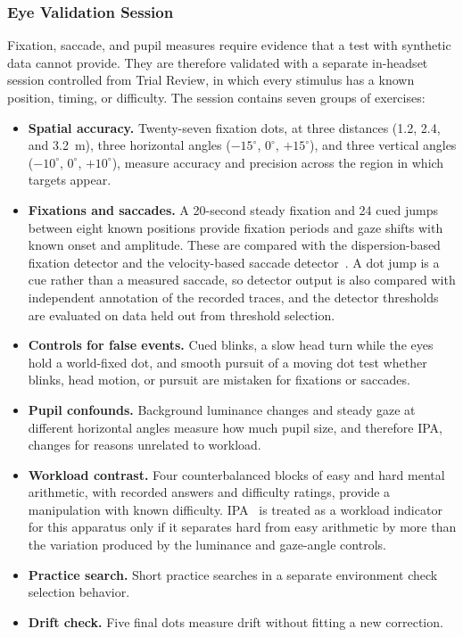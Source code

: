 \subsubsection{Eye Validation Session}
Fixation, saccade, and pupil measures require evidence that a test with synthetic data cannot provide. They are therefore validated with a separate in-headset session controlled from Trial Review, in which every stimulus has a known position, timing, or difficulty. The session contains seven groups of exercises:
\begin{itemize}
\item \textbf{Spatial accuracy.} Twenty-seven fixation dots, at three distances (1.2, 2.4, and 3.2~m), three horizontal angles ($-15^\circ$, $0^\circ$, $+15^\circ$), and three vertical angles ($-10^\circ$, $0^\circ$, $+10^\circ$), measure accuracy and precision across the region in which targets appear.
\item \textbf{Fixations and saccades.} A 20-second steady fixation and 24 cued jumps between eight known positions provide fixation periods and gaze shifts with known onset and amplitude. These are compared with the dispersion-based fixation detector and the velocity-based saccade detector~\cite{salvucci2000fixations}. A dot jump is a cue rather than a measured saccade, so detector output is also compared with independent annotation of the recorded traces, and the detector thresholds are evaluated on data held out from threshold selection.
\item \textbf{Controls for false events.} Cued blinks, a slow head turn while the eyes hold a world-fixed dot, and smooth pursuit of a moving dot test whether blinks, head motion, or pursuit are mistaken for fixations or saccades.
\item \textbf{Pupil confounds.} Background luminance changes and steady gaze at different horizontal angles measure how much pupil size, and therefore IPA, changes for reasons unrelated to workload.
\item \textbf{Workload contrast.} Four counterbalanced blocks of easy and hard mental arithmetic, with recorded answers and difficulty ratings, provide a manipulation with known difficulty. IPA~\cite{duchowski2018ipa} is treated as a workload indicator for this apparatus only if it separates hard from easy arithmetic by more than the variation produced by the luminance and gaze-angle controls.
\item \textbf{Practice search.} Short practice searches in a separate environment check selection behavior.
\item \textbf{Drift check.} Five final dots measure drift without fitting a new correction.
\end{itemize}

